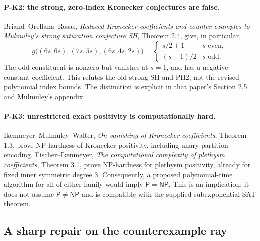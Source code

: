 \documentclass[11pt,a4paper]{article}
\begin{document}
\paragraph{P-K2: the strong, zero-index Kronecker conjectures are false.}
Briand--Orellana--Rosas, \emph{Reduced Kronecker coefficients and
counter-examples to Mulmuley's strong saturation conjecture SH},
Theorem 2.4, give, in particular,
\[
 g\bigl((6s,6s),(7s,5s),(6s,4s,2s)\bigr)
 =
 \begin{cases}s/2+1&s\text{ even},\\(s-1)/2&s\text{ odd}.\end{cases}
 \tag{P-K2}
\]
The odd constituent is nonzero but vanishes at $s=1$, and has a negative
constant coefficient. This refutes the old strong SH and PH2, not the
revised polynomial index bounds. The distinction is explicit in that
paper's Section 2.5 and Mulmuley's appendix.

\paragraph{P-K3: unrestricted exact positivity is computationally hard.}
Ikenmeyer--Mulmuley--Walter, \emph{On vanishing of Kronecker coefficients},
Theorem 1.3, prove NP-hardness of Kronecker positivity, including unary
partition encoding. Fischer--Ikenmeyer, \emph{The computational complexity
of plethysm coefficients}, Theorem 3.1, prove NP-hardness for plethysm
positivity, already for fixed inner symmetric degree $3$.
Consequently, a proposed polynomial-time algorithm for all of either
family would imply $\mathsf P=\mathsf{NP}$. This is an implication;
it does not assume $\mathsf P\ne\mathsf{NP}$ and is compatible with the
supplied subexponential SAT theorem.

\subsection{A sharp repair on the counterexample ray}
\end{document}
